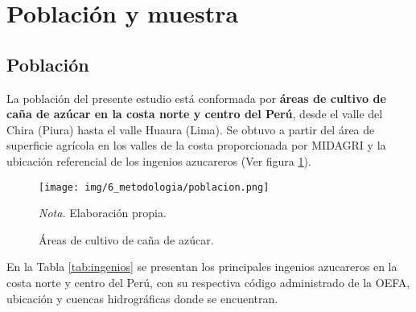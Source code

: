 \section{Población y muestra}
\subsection{Población}
La población del presente estudio está conformada por \textbf{áreas de cultivo de caña de azúcar 
en la costa norte y centro del Perú}, desde el valle del Chira (Piura) hasta el valle Huaura (Lima).
Se obtuvo a partir del área de superficie agrícola en los valles de la costa proporcionada por MIDAGRI y la ubicación referencial de 
los ingenios azucareros (Ver figura \ref{fig:poblacion}).
 
\begin{figure}[H]
    \centering
    \caption{Áreas de cultivo de caña de azúcar.}
    \texttt{[image: img/6\_metodologia/poblacion.png]}
    \label{fig:poblacion}
    \begin{flushleft}
        \vspace{-\baselineskip}
        \textit{Nota.} Elaboración propia.        
        \vspace{-\baselineskip}
    \end{flushleft}
\end{figure}

En la Tabla \ref{tab:ingenios} se presentan los principales ingenios azucareros en la costa norte y centro del Perú, con su respectiva código administrado de la OEFA, ubicación y cuencas 
hidrográficas donde se encuentran.

